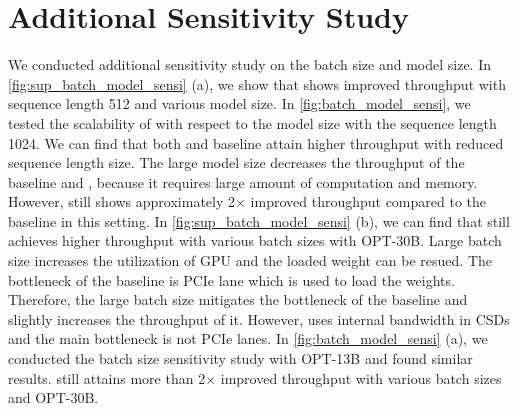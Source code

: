 \section{Additional Sensitivity Study}
We conducted additional sensitivity study on the batch size and model size.
In \cref{fig:sup_batch_model_sensi} (a), we show that \thiswork shows improved throughput with sequence length 512 and various model size.
In \cref{fig:batch_model_sensi}, we tested the scalability of \thiswork with respect to the model size with the sequence length 1024.
We can find that both \thiswork and baseline attain higher throughput with reduced sequence length size.
The large model size decreases the throughput of the baseline and \thiswork, because it requires  large amount of computation and memory.
However, \thiswork still shows approximately 2$\times$ improved throughput compared to the baseline in this setting.
In \cref{fig:sup_batch_model_sensi} (b), we can find that \thiswork still achieves higher throughput with various batch sizes with OPT-30B.
Large batch size increases the utilization of GPU and the loaded weight can be resued.
The bottleneck of the baseline is PCIe lane which is used to load the weights.
Therefore, the large batch size mitigates the bottleneck of the baseline and slightly increases the throughput of it.
However, \thiswork uses internal bandwidth in CSDs and the main bottleneck is not PCIe lanes.
In \cref{fig:batch_model_sensi} (a), we conducted the batch size sensitivity study with OPT-13B and found similar results.
\thiswork still attains more than 2$\times$ improved throughput with various batch sizes and OPT-30B.


